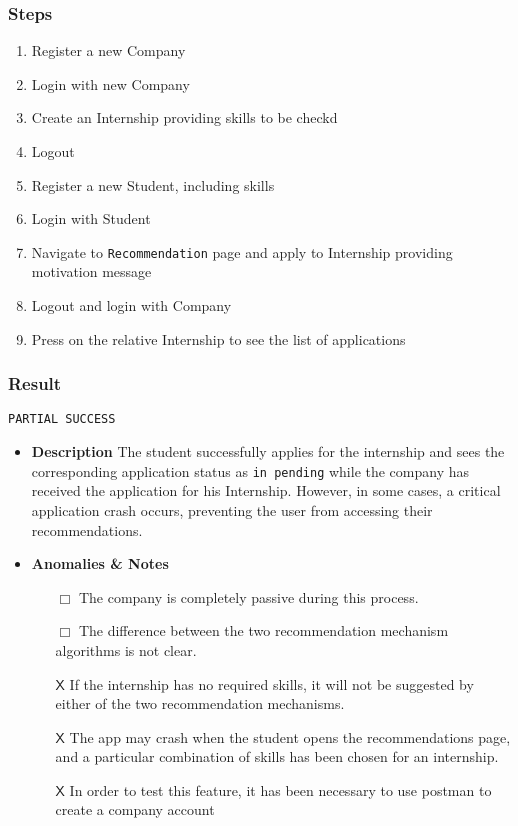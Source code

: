 \subsubsection{Steps}
\begin{enumerate}
    \item Register a new Company
    \item Login with new Company
    \item Create an Internship providing skills to be checkd
    \item Logout
    \item Register a new Student, including skills
    \item Login with Student
    \item Navigate to \verb|Recommendation| page and apply to Internship providing motivation message
    \item Logout and login with Company 
    \item Press on the relative Internship to see the list of applications
\end{enumerate}
\subsubsection{Result}
\verb|PARTIAL SUCCESS|
\begin{itemize}
    \item \textbf{\color{titleColor} Description}
    The student successfully applies for the internship and sees the corresponding application status as \verb|in pending| while the company has received the application for his Internship. However, in some cases, a critical application crash occurs, preventing the user from accessing their recommendations.
    \item \textbf{\color{titleColor} Anomalies \& Notes}
    \begin{itemize}
        \item [{\color{titleColor}\(\Box \)}] The company is completely passive during this process.
        \item [{\color{titleColor}\(\Box \)}] The difference between the two recommendation mechanism algorithms is not clear.
        \item [{\color{titleColor}\(\mathsf{X}\)}] If the internship has no required skills, it will not be suggested by either of the two recommendation mechanisms.
        \item [{\color{titleColor}\(\mathsf{X}\)}] The app may crash when the student opens the recommendations page, and a particular combination of skills has been chosen for an internship.
        \item [{\color{titleColor}\(\mathsf{X}\)}] In order to test this feature, it has been necessary to use postman to create a company account
    \end{itemize}

\end{itemize}
